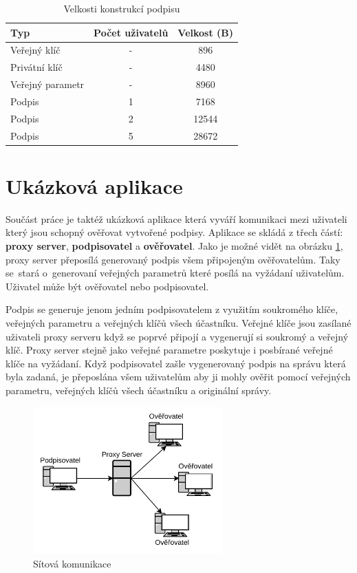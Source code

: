 \begin{table}[htbp]
  \centering
  \caption{Velkosti konstrukcí podpisu}
  \begin{tabular}{|l|c|c|}
    \hline
    Typ              & Počet uživatelů & Velkost (B) \\
    \hline
    Veřejný klíč     & -               & 896         \\
    Privátní klíč    & -               & 4480        \\
    Veřejný parametr & -               & 8960        \\
    Podpis           & 1               & 7168        \\
    Podpis           & 2               & 12544       \\
    Podpis           & 5               & 28672       \\
    \hline
  \end{tabular}
  \label{sizes}
\end{table}


\section{Ukázková aplikace}
Součást práce je taktéž ukázková aplikace která vyváří komunikaci mezi uživateli který jsou schopný ověřovat vytvořené podpisy. Aplikace se skládá z třech částí: \textbf{proxy server}, \textbf{podpisovatel} a \textbf{ověřovatel}. Jako je možné vidět na obrázku \ref{network_diagram}, proxy server přeposílá generovaný podpis všem připojeným ověřovatelům. Taky se~stará o~generovaní veřejných parametrů které posílá na vyžádaní uživatelům. Uživatel může být ověřovatel nebo podpisovatel. 

Podpis se generuje jenom jedním podpisovatelem z využitím soukromého klíče, veřejných parametru a veřejných klíčů všech účastníku. Veřejné klíče jsou zasílané uživateli proxy serveru když se poprvé připojí a vygenerují si soukromý a veřejný klíč. Proxy server stejně jako veřejné parametre poskytuje i posbírané veřejné klíče na vyžádaní. Když podpisovatel zašle vygenerovaný podpis na správu která byla zadaná, je přeposlána všem uživatelům aby ji mohly ověřit pomocí veřejných parametru, veřejných klíčů všech účastníku a originální správy.

\begin{figure}[htbp]
  \centering
  \includegraphics[width=0.65\textwidth]{img/network_diagram.pdf}
  \caption{Sítová komunikace}
  \label{network_diagram}
\end{figure}

